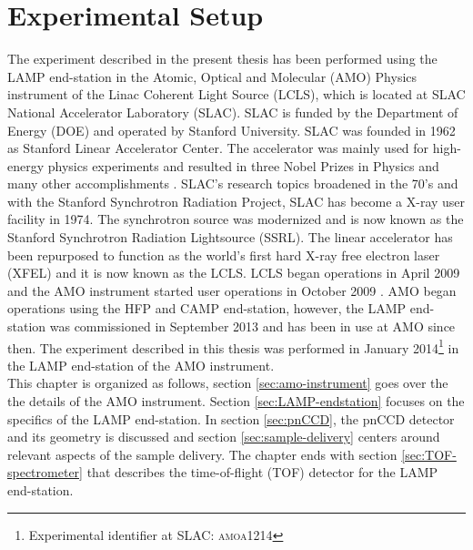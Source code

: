 \chapter{Experimental Setup}\label{ch:exp_setup}
The experiment described in the present thesis has been performed using the LAMP end-station in the Atomic, Optical and Molecular (AMO) Physics instrument of the Linac Coherent Light Source (LCLS), which is located at SLAC National Accelerator Laboratory (SLAC). SLAC is funded by the Department of Energy (DOE) and operated by Stanford University. SLAC was founded in 1962 as Stanford Linear Accelerator Center. The accelerator was mainly used for high-energy physics experiments and resulted in three Nobel Prizes in Physics \citep{Richter-PRL-1974,Taylor-SLAC-1967,Perl-PRL-1975} and many other accomplishments \citep{KELLEHER-1990-cell,Emma-2010-NatPho}. SLAC's research topics broadened in the 70's and with the Stanford Synchrotron Radiation Project, SLAC has become a X-ray user facility in 1974. The synchrotron source was modernized and is now known as the Stanford Synchrotron Radiation Lightsource (SSRL). The linear accelerator has been repurposed to function as the world's first hard X-ray free electron laser (XFEL) and it is now known as the LCLS. LCLS began operations in April 2009 \citep{Emma-2010-NatPho} and the AMO instrument started user operations in October 2009 \citep{Bostedt-2013-JPB}. AMO began operations using the HFP and CAMP end-station, however, the LAMP end-station was commissioned in September 2013 and has been in use at AMO since then. The experiment described in this thesis was performed in January 2014\footnote{Experimental identifier at SLAC: \textsc{amoa1214}} in the LAMP end-station of the AMO instrument.\\
This chapter is organized as follows, section \ref{sec:amo-instrument} goes over the the details of the AMO instrument. Section \ref{sec:LAMP-endstation} focuses on the specifics of the LAMP end-station. In section \ref{sec:pnCCD}, the pnCCD detector and its geometry is discussed and section \ref{sec:sample-delivery} centers around relevant aspects of the sample delivery. The chapter ends with section \ref{sec:TOF-spectrometer} that describes the time-of-flight (TOF) detector for the LAMP end-station.
%
%
%
